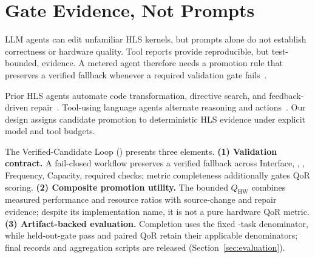 \section{Gate Evidence, Not Prompts}

LLM agents can edit unfamiliar HLS kernels, but prompts alone do not establish
correctness or hardware quality. Tool reports provide reproducible, but
test-bounded, evidence. A metered agent therefore needs a promotion rule that
preserves a verified fallback whenever a required validation gate
fails~\cite{amd2025vitis}.

Prior HLS agents automate code transformation, directive search, and
feedback-driven repair~\cite{xiong2024hlspilot,xu2024ralad,li2026chathls}.
Tool-using language agents alternate reasoning and actions~\cite{yao2023react}.
Our design assigns candidate promotion to deterministic HLS evidence under
explicit model and tool budgets.

The Verified-Candidate Loop (\VCL) presents three elements.
\textbf{(1) Validation contract.} A fail-closed workflow preserves a verified
fallback across Interface, \CSim, \Synth, Frequency, Capacity, required
\CoSim{} checks; metric completeness additionally gates QoR scoring.
\textbf{(2) Composite promotion utility.} The bounded $Q_{\mathrm{HW}}$
combines measured performance and resource ratios with source-change and
repair evidence; despite its implementation name, it is not a pure hardware
QoR metric.
\textbf{(3) Artifact-backed evaluation.} Completion uses the fixed
\CorpusTaskCount{}-task denominator, while held-out-gate pass and paired QoR
retain their applicable denominators; final records and aggregation scripts
are released (Section~\ref{sec:evaluation}).
